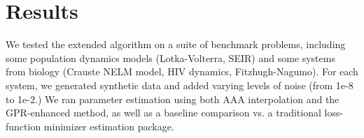 \documentclass{ifacconf}
\newcommand{\sasha}[1]{\textcolor{blue}{#1}}
\begin{document}
    
	\section{Results}
	We tested the extended algorithm on a suite of benchmark problems, including some population dynamics models (Lotka-Volterra, SEIR) and some systems from biology (Crauste NELM model, HIV dynamics, Fitzhugh-Nagumo).  
	For each system, we generated synthetic data and added varying levels of noise (from 1e-8 to 1e-2.)  We ran parameter estimation using both AAA interpolation and the GPR-enhanced method, as well as a baseline comparison vs. a traditional loss-function minimizer estimation package.  


    

\end{document}
